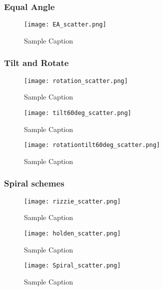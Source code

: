 \documentclass{article}
\begin{document}
\subsubsection{Equal Angle}

\begin{figure}[ht]
    \centering
    \texttt{[image: EA\_scatter.png]}
    \caption{Sample Caption}
\end{figure}

\subsubsection{Tilt and Rotate}

\begin{figure}[ht]
    \centering
    \texttt{[image: rotation\_scatter.png]}
    \caption{Sample Caption}
\end{figure}


\begin{figure}[ht]
    \centering
    \texttt{[image: tilt60deg\_scatter.png]}
    \caption{Sample Caption}
\end{figure}


\begin{figure}[ht]
    \centering
    \texttt{[image: rotationtilt60deg\_scatter.png]}
    \caption{Sample Caption}
\end{figure}



\subsubsection{Spiral schemes}
\begin{figure}[ht]
    \centering
    \texttt{[image: rizzie\_scatter.png]}
    \caption{Sample Caption}
\end{figure}


\begin{figure}[ht]
    \centering
    \texttt{[image: holden\_scatter.png]}
    \caption{Sample Caption}
\end{figure}

\begin{figure}[ht]
    \centering
    \texttt{[image: Spiral\_scatter.png]}
    \caption{Sample Caption}
\end{figure}
\end{document}
